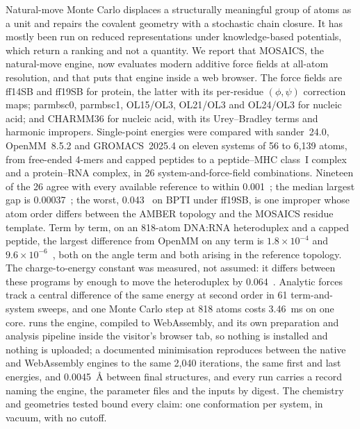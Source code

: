 Natural-move Monte Carlo displaces a structurally meaningful group of atoms as a
unit and repairs the covalent geometry with a stochastic chain closure. It has
mostly been run on reduced representations under knowledge-based potentials,
which return a ranking and not a quantity. We report that MOSAICS, the
natural-move engine, now evaluates modern additive force fields at all-atom
resolution, and that \studio{} puts that engine inside a web browser. The force fields are ff14SB and ff19SB for protein, the latter with its
per-residue $(\phi,\psi)$ correction maps; parmbsc0, parmbsc1, OL15/OL3,
OL21/OL3 and OL24/OL3 for nucleic acid; and CHARMM36 for nucleic acid, with its
Urey--Bradley terms and harmonic impropers. Single-point energies were compared
with sander~24.0, OpenMM~8.5.2 and GROMACS~2025.4 on eleven systems of 56 to
6,139 atoms, from free-ended 4-mers and capped peptides to a peptide--MHC
class~I complex and a protein--RNA complex, in 26 system-and-force-field
combinations. Nineteen of the 26 agree with every available reference to within
0.001~\kcal{}; the median largest gap is 0.00037~\kcal{}; the worst, 0.043~\kcal{}
on BPTI under ff19SB, is one improper whose atom order differs between the
AMBER topology and the MOSAICS residue template. Term by term, on an 818-atom
DNA:RNA heteroduplex and a capped peptide, the largest difference from OpenMM
on any term is $1.8\times10^{-4}$ and $9.6\times10^{-6}$~\kcal{}, both on the
angle term and both arising in the reference topology. The charge-to-energy
constant was measured, not assumed: it differs between these programs by enough
to move the heteroduplex by 0.064~\kcal{}. Analytic forces track a central
difference of the same energy at second order in 61 term-and-system sweeps, and
one Monte Carlo step at 818 atoms costs 3.46~ms on one core. \studio{} runs the
engine, compiled to WebAssembly, and its own preparation and analysis pipeline
inside the visitor's browser tab, so nothing is installed and nothing is
uploaded; a documented minimisation reproduces between the native and
WebAssembly engines to the same 2,040 iterations, the same first and last
energies, and 0.0045~\AA{} between final structures, and every run carries a
record naming the engine, the parameter files and the inputs by digest. The
chemistry and geometries tested bound every claim: one conformation per system,
in vacuum, with no cutoff.
